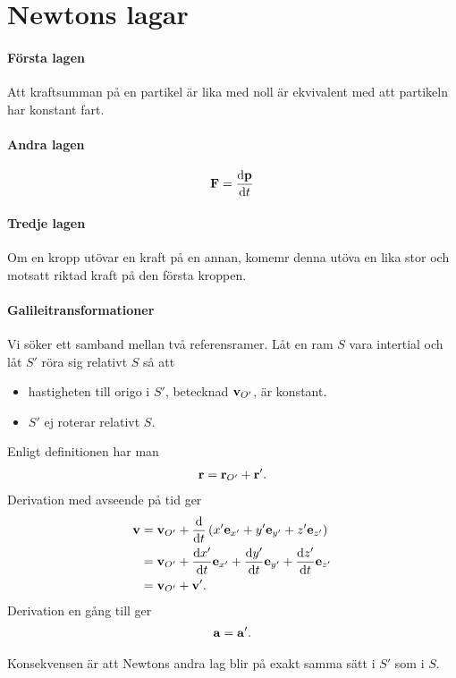 \section{Newtons lagar}

\paragraph{Första lagen}
Att kraftsumman på en partikel är lika med noll är ekvivalent med att partikeln har konstant fart.

\paragraph{Andra lagen}
\begin{align*}
	\vect{F} = \dv{\vect{p}}{t}
\end{align*}

\paragraph{Tredje lagen}
Om en kropp utövar en kraft på en annan, komemr denna utöva en lika stor och motsatt riktad kraft på den första kroppen.

\paragraph{Galileitransformationer}
Vi söker ett samband mellan två referensramer. Låt en ram $S$ vara intertial och låt $S'$ röra sig relativt $S$ så att
\begin{itemize}
	\item hastigheten till origo i $S'$, betecknad $\vb{v}_{O'}$, är konstant.
	\item $S'$ ej roterar relativt $S$.
\end{itemize}

Enligt definitionen har man
\begin{align*}
	\vb{r} = \vb{r}_{O'} + \vb{r}'.
\end{align*}
Derivation med avseende på tid ger
\begin{align*}
	\vb{v} &= \vb{v}_{O'} + \dv{t}\left(x'\vb{e}_{x'} + y'\vb{e}_{y'} + z'\vb{e}_{z'}\right) \\
	       &= \vb{v}_{O'} + \dv{x'}{t}\vb{e}_{x'} + \dv{y'}{t}\vb{e}_{y'} + \dv{z'}{t}\vb{e}_{z'} \\
	       &= \vb{v}_{O'} + \vb{v}'.
\end{align*}
Derivation en gång till ger
\begin{align*}
	\vb{a} = \vb{a}'.
\end{align*}

Konsekvensen är att Newtons andra lag blir på exakt samma sätt i $S'$ som i $S$.